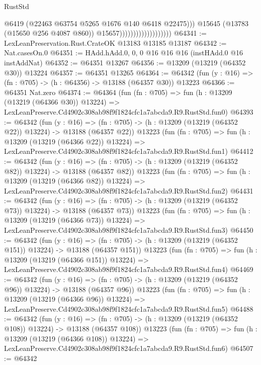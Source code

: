 \begin{lexlean}{RustStd}
\begin{coremodule}
                                              @6419
                                              (@22463 @63754 @5265 @1676 @140 @6418 @22475)))
                                          @15645
                                          (@13783 (@15650 @256 @4087 @860))
                                          @15657)))))))))))))))))))
@64341 := LexLeanPreservation.Rust.CrateOK @13183 @13185 @13187
@64342 := Nat.casesOn.{0}
@64351 := HAdd.hAdd.{0, 0, 0} @16 @16 @16 (instHAdd.{0} @16 instAddNat)
@64352 := @64351 @13267
@64356 := @13209 (@13219 (@64352 @30)) @13224
@64357 := @64351 @13265
@64364 := @64342 (fun (y : @16) => (fn : @705) -> (h : @64356) -> @13188 (@64357 @30)) @13223
@64366 := @64351 Nat.zero
@64374 := @64364
    (fun (fn : @705) =>
    fun (h : @13209 (@13219 (@64366 @30)) @13224) =>
    LexLeanPreserve.Cd4902c308ab98f9f1824cfc1a7abcda9.R9.RustStd.fun0)
@64393 := @64342
    (fun (y : @16) =>
    (fn : @705) -> (h : @13209 (@13219 (@64352 @22)) @13224) -> @13188 (@64357 @22))
    @13223
    (fun (fn : @705) =>
    fun (h : @13209 (@13219 (@64366 @22)) @13224) =>
    LexLeanPreserve.Cd4902c308ab98f9f1824cfc1a7abcda9.R9.RustStd.fun1)
@64412 := @64342
    (fun (y : @16) =>
    (fn : @705) -> (h : @13209 (@13219 (@64352 @82)) @13224) -> @13188 (@64357 @82))
    @13223
    (fun (fn : @705) =>
    fun (h : @13209 (@13219 (@64366 @82)) @13224) =>
    LexLeanPreserve.Cd4902c308ab98f9f1824cfc1a7abcda9.R9.RustStd.fun2)
@64431 := @64342
    (fun (y : @16) =>
    (fn : @705) -> (h : @13209 (@13219 (@64352 @73)) @13224) -> @13188 (@64357 @73))
    @13223
    (fun (fn : @705) =>
    fun (h : @13209 (@13219 (@64366 @73)) @13224) =>
    LexLeanPreserve.Cd4902c308ab98f9f1824cfc1a7abcda9.R9.RustStd.fun3)
@64450 := @64342
    (fun (y : @16) =>
    (fn : @705) -> (h : @13209 (@13219 (@64352 @151)) @13224) -> @13188 (@64357 @151))
    @13223
    (fun (fn : @705) =>
    fun (h : @13209 (@13219 (@64366 @151)) @13224) =>
    LexLeanPreserve.Cd4902c308ab98f9f1824cfc1a7abcda9.R9.RustStd.fun4)
@64469 := @64342
    (fun (y : @16) =>
    (fn : @705) -> (h : @13209 (@13219 (@64352 @96)) @13224) -> @13188 (@64357 @96))
    @13223
    (fun (fn : @705) =>
    fun (h : @13209 (@13219 (@64366 @96)) @13224) =>
    LexLeanPreserve.Cd4902c308ab98f9f1824cfc1a7abcda9.R9.RustStd.fun5)
@64488 := @64342
    (fun (y : @16) =>
    (fn : @705) -> (h : @13209 (@13219 (@64352 @108)) @13224) -> @13188 (@64357 @108))
    @13223
    (fun (fn : @705) =>
    fun (h : @13209 (@13219 (@64366 @108)) @13224) =>
    LexLeanPreserve.Cd4902c308ab98f9f1824cfc1a7abcda9.R9.RustStd.fun6)
@64507 := @64342

\end{coremodule}
\end{lexlean}
